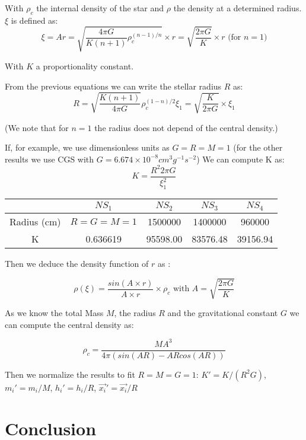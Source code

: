 With $\rho_c$ the internal density of the star and $\rho$ the density at a determined radius. $\xi$ is defined as:  
$$ \xi = Ar = \sqrt{\frac{4\pi G}{K(n+1)}\rho_c^{(n-1)/n}} \times r = \sqrt{\frac{2\pi G}{K}}\times r \mbox{ (for } n=1 \mbox{)}$$

With $K$ a proportionality constant.

From the previous equations we can write the stellar radius $R$ as:
\begin{equation}
R = \sqrt{\frac{K(n+1)}{4\pi G}}\rho_c^{(1-n)/2}\xi_1 = \sqrt{ \frac{K}{2\pi G} } \times \xi_1
\end{equation} 

(We note that for $n=1$ the radius does not depend of the central density.)

If, for example, we use dimensionless units as $G=R=M=1$ (for the other results we use CGS with $G = 6.674 \times 10^{-8} cm^3g^{-1}s^{-2}$) 
We can compute K as: 
\begin{equation}
\label{eq:constant}
K = \frac{R^2  2 \pi G}{\xi_1^2}
\end{equation}

\begin{center}
\begin{tabular}{c|c|c|c|c|}
 & $NS_1$ & $NS_2$ & $NS_3$ & $NS_4$ \\ 
\hline 
Radius (cm) & $R=G=M=1$ & 1500000 & 1400000 & 960000 \\ 
\hline 
K & 0.636619 & 95598.00 & 83576.48 & 39156.94\\ 
\hline 
\end{tabular}
\end{center} 

Then we deduce the density function of $r$ as :

$$\rho(\xi) = \frac{sin(A\times r)}{A \times r} \times \rho_c \mbox{ with } A = \sqrt{\frac{2\pi G}{K}}
$$

As we know the total Mass $M$, the radius $R$ and the gravitational constant $G$ we can compute the central density as: 

$$ \rho_c = \frac{M A^3}{4 \pi (sin(AR)-ARcos(AR)) } $$

Then we normalize the results to fit $R = M = G = 1$: $K' = K/(R^2G) $, $m_i' = m_i/M $, $h_i' = h_i / R$, $\vec{x_i}' = \vec{x_i}/R$ 

\section{Conclusion}
